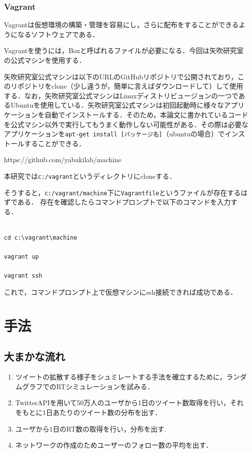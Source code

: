 \newpage

\subsection{Vagrant}

Vagrantは仮想環境の構築・管理を容易にし，さらに配布をすることができるようになるソフトウェアである．

Vagrantを使うには，Boxと呼ばれるファイルが必要になる．今回は矢吹研究室の公式マシンを使用する．

矢吹研究室公式マシンは以下のURLのGitHubリポジトリで公開されており，このリポジトリをclone（少し違うが，簡単に言えばダウンロードして）して使用する．なお，矢吹研究室公式マシンはLinuxディストリビュージョンの一つであるUbuntuを使用している．矢吹研究室公式マシンは初回起動時に様々なアプリケーションを自動でインストールする．そのため，本論文に書かれているコードを公式マシン以外で実行してもうまく動作しない可能性がある．その際は必要なアプリケーションを\texttt{apt-get install [パッケージ名]}（ubuntuの場合）でインストールすることができる．

https://github.com/yabukilab/machine

本研究では\texttt{c:/vagrant}というディレクトリにcloneする．

そうすると，\texttt{c:/vagrant/machine}下に\texttt{Vagrantfile}というファイルが存在するはずである．
存在を確認したらコマンドプロンプトで以下のコマンドを入力する．

\begin{verbatim}

cd c:\vagrant\machine

vagrant up

vagrant ssh

\end{verbatim}

これで，コマンドプロンプト上で仮想マシンにssh接続できれば成功である．



\chapter{手法}

\section{大まかな流れ}

\begin{enumerate}
\item ツイートの拡散する様子をシュミレートする手法を確立するために，ランダムグラフでのRTシミュレーションを試みる\cite{netto}．
\item TwitterAPIを用いて50万人のユーザから1日のツイート数取得を行い，それをもとに1日あたりのツイート数の分布を出す．
\item ユーザから1日のRT数の取得を行い，分布を出す.
\item ネットワークの作成のためユーザーのフォロー数の平均を出す\cite{netto2}．
\end{enumerate}
\newpage

